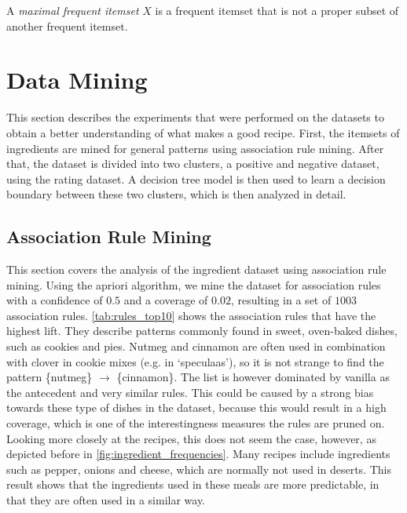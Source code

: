 \begin{definition}
	A \emph{maximal frequent itemset} $X$ is a frequent itemset that is not a proper subset of another frequent itemset.
\end{definition}





\section{Data Mining}
\label{sec:data_mining}

This section describes the experiments that were performed on the datasets to obtain a better understanding of what makes a good recipe.
First, the itemsets of ingredients are mined for general patterns using association rule mining.
After that, the dataset is divided into two clusters, a positive and negative dataset, using the rating dataset.
A decision tree model is then used to learn a decision boundary between these two clusters, which is then analyzed in detail.




\subsection{Association Rule Mining}
\label{subsec:association_rule_mining}

This section covers the analysis of the ingredient dataset using association rule mining.
Using the apriori algorithm, we mine the dataset for association rules with a confidence of $0.5$ and a coverage of $0.02$, resulting in a set of $1003$ association rules.
\cref{tab:rules_top10} shows the association rules that have the highest lift.
They describe patterns commonly found in sweet, oven-baked dishes, such as cookies and pies.
Nutmeg and cinnamon are often used in combination with clover in cookie mixes (e.g. in `speculaas'), so it is not strange to find the pattern \{nutmeg\} $\rightarrow$ \{cinnamon\}.
The list is however dominated by vanilla as the antecedent and very similar rules.
This could be caused by a strong bias towards these type of dishes in the dataset, because this would result in a high coverage, which is one of the interestingness measures the rules are pruned on.
Looking more closely at the recipes, this does not seem the case, however, as depicted before in \cref{fig:ingredient_frequencies}.
Many recipes include ingredients such as pepper, onions and cheese, which are normally not used in deserts.
This result shows that the ingredients used in these meals are more predictable, in that they are often used in a similar way.


